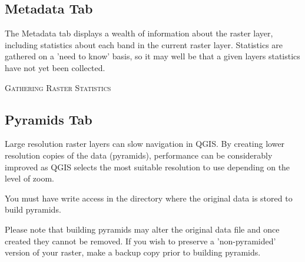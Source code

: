 \subsection{Metadata Tab}
The Metadata tab displays a wealth of information about the raster layer,
including statistics about each band in the current raster layer. Statistics are
gathered on a 'need to know' basis, so it may well be that a given layers
statistics have not yet been collected.


\begin{Tip}\caption{\textsc{Gathering Raster Statistics}}
\end{Tip}
\subsection{Pyramids Tab}
\label{raster_pyramids}
Large resolution raster layers can slow navigation in QGIS. By creating lower
resolution copies of the data (pyramids), performance can be considerably
improved as QGIS selects the most suitable resolution to use depending on the
level of zoom. 

You must have write access in the directory where the original data is stored to build pyramids. 

Please note that building pyramids may alter the original data file and once created they cannot be removed. If you wish to preserve a 'non-pyramided' version of your raster, make a backup copy prior to building pyramids.
